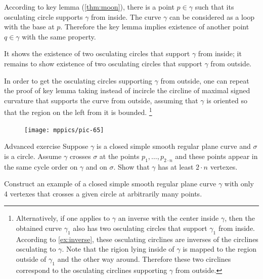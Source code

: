 According to key lemma (\ref{thm:moon}), there is a point $p\in\gamma$ such that its osculating circle supports $\gamma$ from inside.
The curve $\gamma$ can be considered as a loop with the base at $p$.
Therefore the key lemma implies existence of another point $q\in\gamma$ with the same property.

It shows the existence of two osculating circles that support $\gamma$ from inside;
it remains to show existence of two osculating circles that support $\gamma$ from outside.

In order to get the osculating circles supporting $\gamma$ from outside, one can repeat the proof of key lemma taking instead of incircle the circline of maximal signed curvature that supports the curve from outside, assuming that $\gamma$ is oriented so that the region on the left from it is bounded.%
\footnote{Alternatively, if one applies to $\gamma$ an inverse with the center inside $\gamma$, then the obtained curve $\gamma_1$ also has  two osculating circles that support $\gamma_1$ from inside.
According to \ref{ex:inverse}, these osculating circlines are inverses of the circlines osculating to $\gamma$.
Note that the rigion lying inside of $\gamma$ is mapped to the region outside of $\gamma_1$ and the other way around.
Therefore these two circlines correspond to the osculating circlines supporting $\gamma$ from outside.}
\qeds

\begin{figure}
\vskip0mm
\centering
\texttt{[image: mppics/pic-65]}
\vskip0mm
\end{figure}

\begin{thm}{Advanced exercise}\label{ex:curve-crosses-circle}
Suppose $\gamma$ is a closed simple smooth regular plane curve and $\sigma$ is a circle.
Assume $\gamma$ crosses $\sigma$ at the points $p_1,\dots,p_{2{\cdot} n}$ and these points appear in the same cycle order on $\gamma$ and on $\sigma$.
Show that $\gamma$ has at least $2\cdot n$ vertexes.

Construct an example of a closed simple smooth regular plane curve $\gamma$ with only 4 vertexes that crosses a given circle at arbitrarily many points. 
\end{thm}

